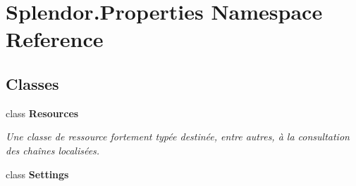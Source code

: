 \hypertarget{namespace_splendor_1_1_properties}{}\section{Splendor.\+Properties Namespace Reference}
\label{namespace_splendor_1_1_properties}
\subsection*{Classes}
\begin{DoxyCompactItemize}
\item 
class {\bfseries Resources}
\begin{DoxyCompactList}\small\item\em Une classe de ressource fortement typée destinée, entre autres, à la consultation des chaînes localisées. \end{DoxyCompactList}\item 
class {\bfseries Settings}
\end{DoxyCompactItemize}

